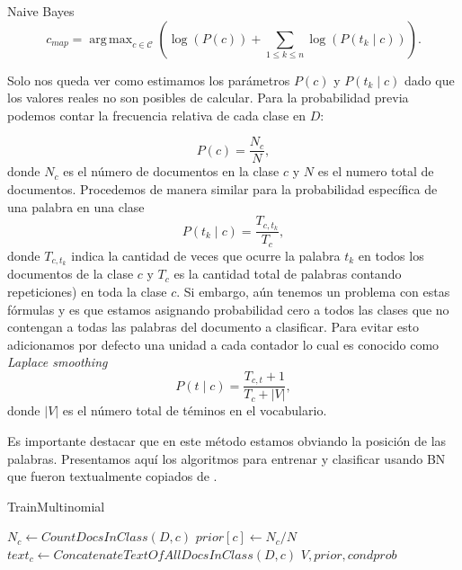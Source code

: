 \documentclass{llncs}
\DeclareMathOperator*{\argmax}{arg\,max}
\begin{document}
\begin{subsection}{Naive Bayes}
		\[
				c_{map} = \argmax_{c\in\mathcal{C}} \left( \log(P(c))  + \sum_{1\leq k\leq n} \log(P(t_k\mid c)) \right).
		\]
		
		Solo nos queda ver como estimamos los par\'ametros $P(c)$ y $P (t_k\mid c)$ dado que los valores reales no son posibles de calcular.	Para la probabilidad previa podemos contar la frecuencia relativa de cada clase en $D$:
		
		\[P(c) = \frac{ N_c }{N} , \]
		donde $N_c$ es el n\'umero de documentos en la clase $c$ y $N$ es el numero total de documentos. Procedemos de manera similar para la probabilidad espec\'ifica de una palabra en una clase
		\[
			P(t_k\mid c) =\frac{ T_{c,t_k}}{T_{c}},
		\]
		donde $T_{c,t_k}$ indica la cantidad de veces que ocurre  la palabra $t_k$ en todos los documentos de la clase $c$ y $T_{c}$ es la cantidad total de palabras contando repeticiones) en toda la clase $c$. Si embargo, a\'un tenemos un problema con estas f\'ormulas y es que estamos asignando probabilidad cero a todos las clases que no contengan a todas las palabras del documento a clasificar. Para evitar esto adicionamos por defecto una unidad a cada contador lo cual es conocido como \emph{Laplace smoothing}
		\[
			P(t\mid c) = \frac{T_{c,t} + 1}{T_c + |V|},	
		\]
		donde $|V|$ es el n\'umero total de t\'eminos en el vocabulario.
		
		 Es importante destacar que en este m\'etodo estamos obviando la posici\'on de las palabras. Presentamos aqu\'i los algoritmos para entrenar y clasificar usando BN que fueron textualmente copiados de \color{red}{2009 Manning C. D., Introduction to Information Retrieval, p\'agina 260. [No recuerdo como citar esto correctamente. Also recordar que agregue unos paquetes arriba que no se si se agragan aqui o en otro de los .tex]}\color{black}.
		 
		 
		 
		 \begin{algorithm}{}
		 			\caption{TrainMultinomial}
		 	\begin{algorithmic}[1]
		 		
		 		\State $N_c \leftarrow CountDocsInClass(D,c)$
		 		\State $prior[c] \leftarrow N_c/N$
		 		\State $text_c \leftarrow ConcatenateTextOfAllDocsInClass(D, c)$
		 		\EndFor
		 		\EndFor 
		 		\EndFor
		 		\State \textbf{\Return} $V, prior, condprob$
		 	\end{algorithmic}
		 \end{algorithm}
		 

\end{subsection}
\end{document}
